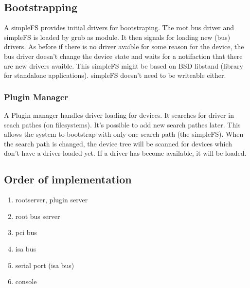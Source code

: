 \documentclass[9pt,a4paper]{extarticle}
\begin{document}
\subsection{Bootstrapping}

A simpleFS provides initial drivers for bootstraping.  The root bus
driver and simpleFS is loaded by grub as module.  It then signals for
loading new (bus) drivers.  As before if there is no driver avaible
for some reason for the device, the bus driver doesn't change the
device state and waits for a notifaction that there are new drivers
avaible. This simpleFS might be based on BSD libstand (library for
standalone applications).  simpleFS doesn't need to be writeable
either.


\subsubsection{Plugin Manager}
A Plugin manager handles driver loading for devices.  It searches for
driver in seach pathes (on filesystems).  It's possible to add new
search pathes later.  This allows the system to bootstrap with only
one search path (the simpleFS).  When the search path is changed, the
device tree will be scanned for devices which don't have a driver
loaded yet.  If a driver has become available, it will be loaded.


\subsection{Order of implementation}

\begin{enumerate}
\item rootserver, plugin server
\item root bus server
\item pci bus
\item isa bus
\item serial port  (isa bus)
\item console 
\end{enumerate}
\end{document}

